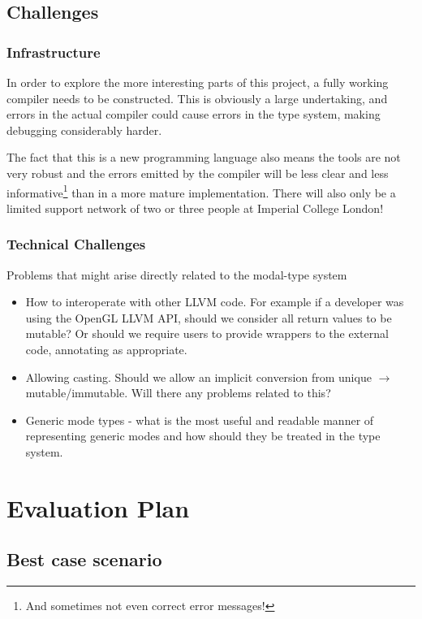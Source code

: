 \documentclass[pdftex,12pt,a4paper]{article}
\begin{document}
\subsection{Challenges}

\subsubsection{Infrastructure}

In order to explore the more interesting parts of this project, a fully working compiler needs to be constructed.
This is obviously a large undertaking, and errors in the actual compiler could cause errors in the type system, making debugging considerably harder.

The fact that this is a new programming language also means the tools are not very robust and the errors emitted by the compiler will be less clear and less informative\footnote{And sometimes not even correct error messages!} than in a more mature implementation.
There will also only be a limited support network of two or three people at Imperial College London!

\subsubsection{Technical Challenges}

Problems that might arise directly related to the modal-type system
	\begin{itemize}
		\item How to interoperate with other LLVM code. For example if a developer was using the OpenGL LLVM API, should we consider all return values to be mutable?
			Or should we require users to provide wrappers to the external code, annotating as appropriate.
		\item Allowing casting. Should we allow an implicit conversion from unique $\to$ mutable/immutable.
			Will there any problems related to this?
		\item Generic mode types - what is the most useful and readable manner of representing generic modes and how should they be treated in the type system.
	\end{itemize}

\newpage
\section{Evaluation Plan}

\subsection{Best case scenario}
\end{document}
